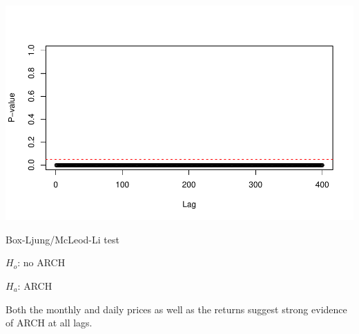 \documentclass[11pt]{article}\usepackage[]{graphicx}\usepackage[]{color}
\makeatletter
\def\maxwidth{ %
  \ifdim\Gin@nat@width>\linewidth
    \linewidth
  \else
    \Gin@nat@width
  \fi
}
\newenvironment{knitrout}{}{} %
\makeatother
\begin{document}
\begin{knitrout}
{}




{\centering \includegraphics[width=\maxwidth]{figure/abs_plots-16} 

}



\end{knitrout}


Box-Ljung/McLeod-Li test

$H_{o}$: no ARCH

$H_{a}$: ARCH

Both the monthly and daily prices as well as the returns suggest strong evidence of ARCH at all lags.
\end{document}
